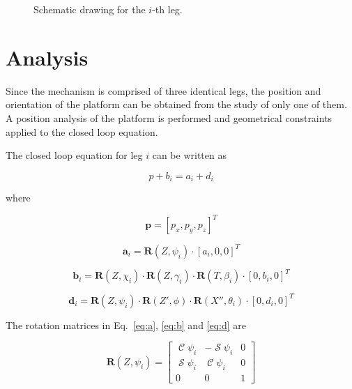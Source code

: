 \documentclass[titlepage, letterpaper]{article}
\DeclareMathOperator{\cose}{\mathcal{C}}
\DeclareMathOperator{\sen}{\mathcal{S}}
\begin{document}
\begin{figure}[htbp]
\begin{subfigure}[b]{0.45\textwidth}
    \end{subfigure}
    \caption{Schematic drawing for the $i$-th leg.}
    \label{fig:schema}
\end{figure}

\section{Analysis}
\label{sec:analysis}

Since the mechanism is comprised of three identical legs, the position and orientation of the platform can be obtained from the study of only one of them. A position analysis of the platform is performed and geometrical constraints applied to the closed loop equation.

The closed loop equation for leg $i$ can be written as

\begin{equation}
\label{eq:closed_loop}
    p + b_i = a_i + d_i
\end{equation}

where

\begin{equation}
    \label{eq:p}
    \mathbf{p} = [p_x, p_y, p_z]^T
\end{equation}

\begin{equation}
    \label{eq:a}
    \mathbf{a}_i = \mathbf{R}(Z,\psi_i) \cdot [a_i,0,0]^T
\end{equation}

\begin{equation}
    \label{eq:b}
    \mathbf{b}_i = \mathbf{R}(Z,\chi_i) \cdot \mathbf{R}(Z,\gamma_i) \cdot \mathbf{R}(T,\beta_i) \cdot [0, b_i, 0]^T
\end{equation}

\begin{equation}
    \label{eq:d}
    \mathbf{d}_i = \mathbf{R}(Z,\psi_i) \cdot \mathbf{R}(Z',\phi) \cdot \mathbf{R}(X'',\theta_{i}) \cdot [0, d_i, 0]^T
\end{equation}

The rotation matrices in Eq.~\ref{eq:a}, \ref{eq:b} and \ref{eq:d} are

\begin{equation}
    \label{eq:rot_Zpsi}
    \mathbf{R}(Z,\psi_i) =
    \begin{bmatrix}
        \cose\psi_i & -\sen\psi_i & 0 \\
        \sen\psi_i & \cose\psi_i & 0 \\
        0 & 0 & 1
    \end{bmatrix}
\end{equation}
\end{document}
